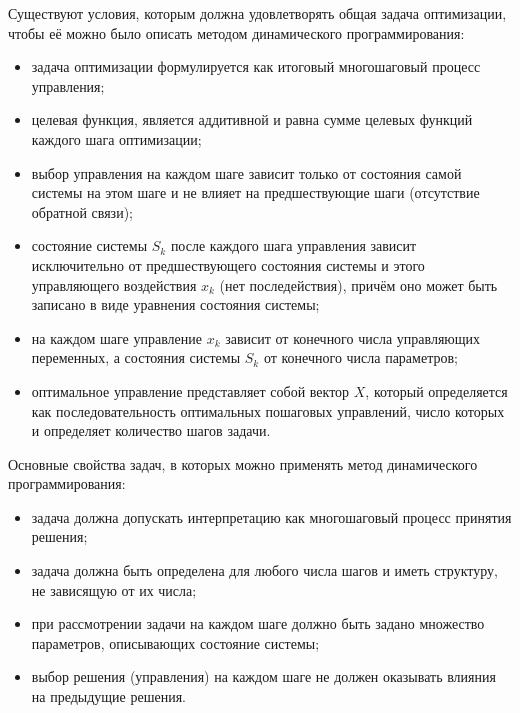 Существуют условия, которым должна удовлетворять общая задача оптимизации, чтобы её можно было описать методом динамического программирования:
\begin{itemize}[label=\textbullet, wide]
    \item задача оптимизации формулируется как итоговый многошаговый процесс управления;
    \item целевая функция, является аддитивной и равна сумме целевых функций каждого шага оптимизации;
    \item выбор управления на каждом шаге зависит только от состояния самой системы на этом шаге и не влияет на предшествующие шаги (отсутствие обратной связи);
    \item состояние системы $S_k$ после каждого шага управления зависит исключительно от предшествующего состояния системы и этого управляющего воздействия $x_k$ (нет последействия), причём оно может быть записано в виде уравнения состояния системы;
    \item на каждом шаге управление $x_k$ зависит от конечного числа управляющих переменных, а состояния системы $S_k$ от конечного числа параметров; 
    \item оптимальное управление представляет собой вектор $X$, который определяется как последовательность оптимальных пошаговых управлений, число которых и определяет количество шагов задачи.
\end{itemize}

Основные свойства задач, в которых можно применять метод динамического программирования:
\begin{itemize}[label=\textbullet, wide]
    \item задача должна допускать интерпретацию как многошаговый процесс принятия решения;
    \item задача должна быть определена для любого числа шагов и иметь структуру, не зависящую от их числа;
    \item при рассмотрении задачи на каждом шаге должно быть задано множество параметров, описывающих состояние системы;
    \item выбор решения (управления) на каждом шаге не должен оказывать влияния на предыдущие решения.
\end{itemize}
